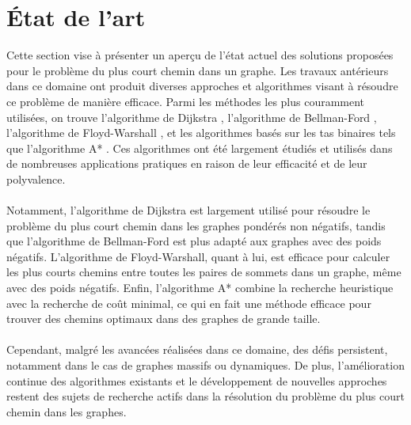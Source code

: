 \documentclass[journal, a4paper]{IEEEtran}
\begin{document}

\section{État de l'art}
	Cette section vise à présenter un aperçu de l'état actuel des solutions proposées pour le problème du plus court chemin dans un graphe. Les travaux antérieurs dans ce domaine ont produit diverses approches et algorithmes visant à résoudre ce problème de manière efficace. Parmi les méthodes les plus couramment utilisées, on trouve l'algorithme de Dijkstra \cite{dijkstra1959note}, l'algorithme de Bellman-Ford \cite{bellman1958routing}, l'algorithme de Floyd-Warshall \cite{floyd1962algorithm}, et les algorithmes basés sur les tas binaires tels que l'algorithme A* \cite{hart1968formal}. Ces algorithmes ont été largement étudiés et utilisés dans de nombreuses applications pratiques en raison de leur efficacité et de leur polyvalence. \\
\\
	Notamment, l'algorithme de Dijkstra est largement utilisé pour résoudre le problème du plus court chemin dans les graphes pondérés non négatifs, tandis que l'algorithme de Bellman-Ford est plus adapté aux graphes avec des poids négatifs. L'algorithme de Floyd-Warshall, quant à lui, est efficace pour calculer les plus courts chemins entre toutes les paires de sommets dans un graphe, même avec des poids négatifs. Enfin, l'algorithme A* combine la recherche heuristique avec la recherche de coût minimal, ce qui en fait une méthode efficace pour trouver des chemins optimaux dans des graphes de grande taille. \\
\\
	Cependant, malgré les avancées réalisées dans ce domaine, des défis persistent, notamment dans le cas de graphes massifs ou dynamiques. De plus, l'amélioration continue des algorithmes existants et le développement de nouvelles approches restent des sujets de recherche actifs dans la résolution du problème du plus court chemin dans les graphes.
\end{document}
